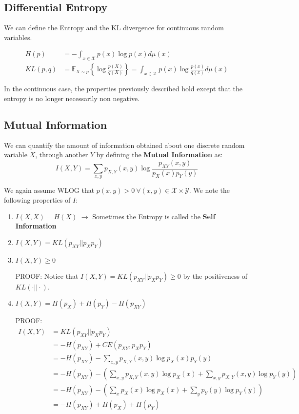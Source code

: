 \documentclass[]{article}
\theoremstyle{mattstyle}
\theoremstyle{definition}
\begin{document}
\subsection{Differential Entropy}
We can define the Entropy and the KL divergence for continuous random variables.

\begin{align}
H(p) &= -\int_{x\in\mathcal{X}}p(x)\log p(x)d\mu(x) \\
KL(p,q) &= \mathbb{E}_{X\sim p}\left\{\log \frac{p(X)}{q(X)}\right\} = \int_{x\in\mathcal{X}}p(x)\log\frac{p(x)}{q(x)}d\mu(x)
\end{align}

In the continuous case, the properties previously described hold except that the entropy is no longer necessarily non negative.

\subsection{Mutual Information}
We can quantify the amount of information obtained about one discrete random variable $X$, through another $Y$ by defining the \textbf{Mutual Information} as:
\begin{equation}
I(X,Y)=\sum_{x,y}p_{X,Y}(x,y)\log\frac{p_{XY}(x,y)}{p_X(x)p_Y(y)}
\end{equation}

We again assume WLOG that \(p(x,y)>0 \ \forall (x,y)\in\mathcal{X}\times\mathcal{Y}\). We note the following properties of $I$:

\begin{enumerate}
	\item \(I(X,X) = H(X)\) \(\rightarrow\) Sometimes the Entropy is called the \textbf{Self Information}
	\item $I(X,Y) = KL(p_{XY}||p_Xp_Y)$
	\item \(I(X,Y)\ge 0\)
	
	PROOF: Notice that \(I(X,Y) = KL(p_{XY}||p_Xp_Y) \ge 0\) by the positiveness of \(KL(\cdot||\cdot)\).
	
	\item $I(X,Y) = H(p_X) + H(p_Y) -H(p_{XY})$
	
	PROOF:
	\begin{align*}
	I(X,Y) &= KL(p_{XY}||p_Xp_Y) \\
	&= -H(p_{XY}) + CE(p_{XY},p_Xp_Y) \\
	&= -H(p_{XY}) - \sum_{x,y}p_{X,Y}(x,y)\log p_X(x)p_Y(y)\\
	&= -H(p_{XY}) - \left(\sum_{x,y}p_{X,Y}(x,y)\log p_X(x) + \sum_{x,y}p_{X,Y}(x,y)\log p_Y(y)\right)\\
	&=-H(p_{XY}) - \left(\sum_{x}p_{X}(x)\log p_X(x) + \sum_{y}p_{Y}(y)\log p_Y(y)\right)\\
	&= -H(p_{XY}) + H(p_X) + H(p_Y)
	\end{align*}
\end{enumerate}
\end{document}
